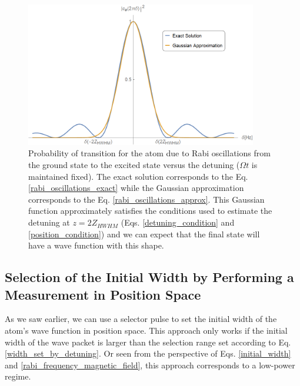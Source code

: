\documentclass{article}
\begin{document}
\begin{figure}
    \centering
    \includegraphics[width=0.9\textwidth]{ce2_VS_detuning_general.png}
     \caption{Probability of transition for the atom due to Rabi oscillations from the ground state to the excited state versus the detuning ($\Omega t$ is maintained fixed). The exact solution corresponds to the Eq. \ref{rabi_oscillations_exact} while the Gaussian approximation corresponds to the Eq. \ref{rabi_oscillations_approx}. This Gaussian function approximately satisfies the conditions used to estimate the detuning at $z=2Z_{HWHM}$ (Eqs. \ref{detuning_condition} and \ref{position_condition}) and we can expect that the final state will have a wave function with this shape.}
     \label{ce2_VS_detuning}
\end{figure}

\subsection{Selection of the Initial Width by Performing a Measurement in Position Space}
As we saw earlier, we can use a selector pulse to set the initial width of the atom's wave function in position space. This approach only works if the initial width of the wave packet is larger than the selection range set according to Eq. \ref{width_set_by_detuning}. Or seen from the perspective of Eqs. \ref{initial_width} and \ref{rabi_frequency_magnetic_field}, this approach corresponds to a low-power regime.
\end{document}
